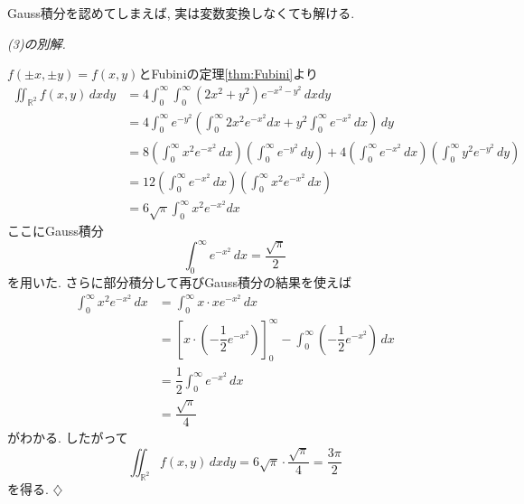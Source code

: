 \documentclass[titlepage]{jsarticle}
\numberwithin{equation}{section}
\newcommand{\R}{\mathbb{R}}%
\newenvironment{kaitou}[1][解]{%
\begin{proofbox}%
\textit{#1. }\ignorespaces
}{%
\hfill$\diamondsuit$%
\end{proofbox}%
}
\begin{document}
Gauss積分を認めてしまえば, 実は変数変換しなくても解ける.
\begin{kaitou}[(3)の別解]
$f(\pm x, \pm y) = f(x, y)$とFubiniの定理\ref{thm:Fubini}より
\begin{align*}
\iint_{\R^2} f(x, y)\,dxdy &= 4\int_0^\infty\int_0^\infty (2x^2 + y^2)e^{-x^2 - y^2}\,dxdy\\
 &= 4\int_0^\infty e^{-y^2} \left(\int_0^\infty 2x^2e^{-x^2}dx + y^2\int_0^\infty e^{-x^2}\,dx \right)\,dy\\
&= 8\left(\int_0^\infty x^2e^{-x^2}\,dx\right)\left(\int_0^\infty e^{-y^2}\,dy \right)+4\left(\int_0^\infty e^{-x^2}\,dx\right)\left(\int_0^\infty y^2e^{-y^2}\,dy\right) \\
&= 12\left(\int_0^\infty e^{-x^2}\,dx\right)\left(\int_0^\infty x^2e^{-x^2}\,dx\right)\\
&= 6\sqrt{\pi}\int_0^\infty x^2e^{-x^2}dx
\end{align*}
ここにGauss積分
\[
\int_0^\infty e^{-x^2}\,dx = \dfrac{\sqrt{\pi}}{2}
\]
を用いた. さらに部分積分して再びGauss積分の結果を使えば
\begin{align*}
\int_0^\infty x^2e^{-x^2}\,dx &= \int_0^\infty x\cdot xe^{-x^2}\,dx\\
&= \left[x\cdot \left(-\dfrac{1}{2}e^{-x^2}\right)\right]_0^{\infty} - \int_0^\infty \left(-\dfrac{1}{2}e^{-x^2}\right)\,dx\\
&= \dfrac{1}{2}\int_0^\infty e^{-x^2}\,dx\\
&= \dfrac{\sqrt{\pi}}{4}
\end{align*}
がわかる. したがって
\[
\iint_{\R^2} f(x, y)\,dxdy = 6\sqrt{\pi} \cdot \dfrac{\sqrt{\pi}}{4} = \boxed{\dfrac{3\pi}{2}}
\]
を得る.
\end{kaitou}
\end{document}
